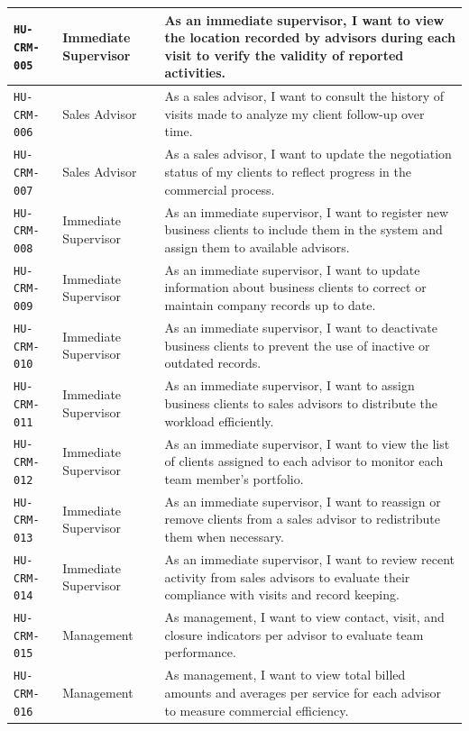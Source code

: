 \documentclass[letterpaper%
, oneside%
, 12pt%
, memoireprojet%
, english%
,creativecommons,hyperref, withAlgo2e %
]{thETS}
\begin{document}
\begin{longtable}{|L{2.5cm}|L{3.2cm}|L{7.9cm}|}
\hline
\texttt{HU-CRM-005} & Immediate Supervisor & As an immediate supervisor, I want to view the location recorded by advisors during each visit to verify the validity of reported activities. \\
\hline
\texttt{HU-CRM-006} & Sales Advisor & As a sales advisor, I want to consult the history of visits made to analyze my client follow-up over time. \\
\hline
\texttt{HU-CRM-007} & Sales Advisor & As a sales advisor, I want to update the negotiation status of my clients to reflect progress in the commercial process. \\
\hline
\texttt{HU-CRM-008} & Immediate Supervisor & As an immediate supervisor, I want to register new business clients to include them in the system and assign them to available advisors. \\
\hline
\texttt{HU-CRM-009} & Immediate Supervisor & As an immediate supervisor, I want to update information about business clients to correct or maintain company records up to date. \\
\hline
\texttt{HU-CRM-010} & Immediate Supervisor & As an immediate supervisor, I want to deactivate business clients to prevent the use of inactive or outdated records. \\
\hline
\texttt{HU-CRM-011} & Immediate Supervisor & As an immediate supervisor, I want to assign business clients to sales advisors to distribute the workload efficiently. \\
\hline
\texttt{HU-CRM-012} & Immediate Supervisor & As an immediate supervisor, I want to view the list of clients assigned to each advisor to monitor each team member’s portfolio. \\
\hline
\texttt{HU-CRM-013} & Immediate Supervisor & As an immediate supervisor, I want to reassign or remove clients from a sales advisor to redistribute them when necessary. \\
\hline
\texttt{HU-CRM-014} & Immediate Supervisor & As an immediate supervisor, I want to review recent activity from sales advisors to evaluate their compliance with visits and record keeping. \\
\hline
\texttt{HU-CRM-015} & Management & As management, I want to view contact, visit, and closure indicators per advisor to evaluate team performance. \\
\hline
\texttt{HU-CRM-016} & Management & As management, I want to view total billed amounts and averages per service for each advisor to measure commercial efficiency. \\

\end{longtable}
\end{document}
